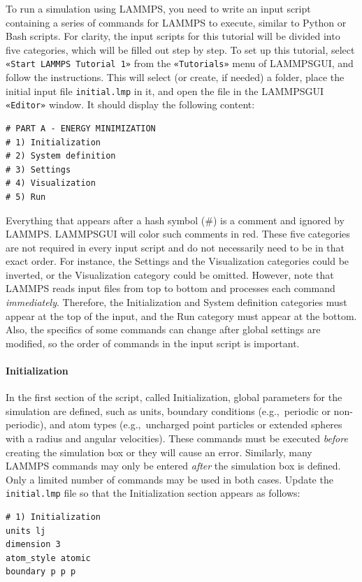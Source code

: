 \documentclass[9pt,tutorial]{livecoms}
\newcommand{\lmpcmd}[1]{\hspace{0pt}\colorbox{listing}{\textcolor{command}{\small{#1}}}\hspace{0pt}} %
\newcommand{\flecmd}[1]{\textcolor{command}{\texttt{#1}}} %
\newcommand{\guicmd}[1]{\textcolor{command}{\texttt{«#1»}}} %
\newcommand{\lammpsgui}{\textsf{LAMMPS\textendash GUI}}
\begin{document}
To run a simulation using LAMMPS, you need to write an input script
containing a series of commands for LAMMPS to execute, similar to Python
or Bash scripts.  For clarity, the input scripts for this tutorial will
be divided into five categories, which will be filled out step by step.
To set up this tutorial, select \guicmd{Start LAMMPS Tutorial 1} from
the \guicmd{Tutorials} menu of \lammpsgui{}, and follow the
instructions.  This will select (or create, if needed) a folder, place
the initial input file \flecmd{initial.lmp} in it, and open the file in
the \lammpsgui{} \guicmd{Editor} window.  It should display the following
content:
\begin{lstlisting}
# PART A - ENERGY MINIMIZATION
# 1) Initialization
# 2) System definition
# 3) Settings
# 4) Visualization
# 5) Run
\end{lstlisting}
Everything that appears after a hash symbol ($\#$) is a comment
and ignored by LAMMPS.  \lammpsgui{} will color such comments in red.
These five categories are not required in every input script and do not
necessarily need to be in that exact order.  For instance, the \lmpcmd{Settings}
and the \lmpcmd{Visualization} categories could be inverted, or
the \lmpcmd{Visualization} category could be omitted.  However, note that
LAMMPS reads input files from top to bottom and processes each command
\emph{immediately}.  Therefore, the \lmpcmd{Initialization} and
\lmpcmd{System definition} categories must appear at the top of the
input, and the \lmpcmd{Run} category must appear at the bottom.  Also, the
specifics of some commands can change after global settings are modified, so the
order of commands in the input script is important.

\paragraph{Initialization}

In the first section of the script, called \lmpcmd{Initialization},
global parameters for the simulation are defined, such as units, boundary conditions
(e.g.,~periodic or non-periodic), and atom types (e.g.,~uncharged point particles
or extended spheres with a radius and angular velocities).  These commands must be
executed \emph{before} creating the simulation box or they will cause
an error.  Similarly, many LAMMPS commands may only be
entered \emph{after} the simulation box is defined.  Only a limited
number of commands may be used in both cases.  Update the \flecmd{initial.lmp} file
so that the \lmpcmd{Initialization} section appears as follows:
\begin{lstlisting}
# 1) Initialization
units lj
dimension 3
atom_style atomic
boundary p p p
\end{lstlisting}
\end{document}
